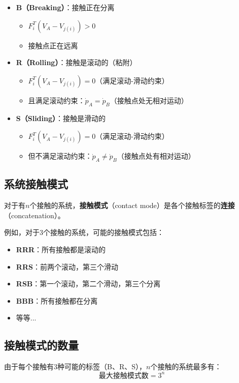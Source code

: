 \documentclass[12pt,a4paper]{article}
\begin{document}
\begin{itemize}
\item \textbf{B（Breaking）}：接触正在分离
  \begin{itemize}
  \item $F_i^T (V_A - V_{j(i)}) > 0$
  \item 接触点正在远离
  \end{itemize}

\item \textbf{R（Rolling）}：接触是滚动的（粘附）
  \begin{itemize}
  \item $F_i^T (V_A - V_{j(i)}) = 0$（满足滚动-滑动约束）
  \item 且满足滚动约束：$\dot{p}_A = \dot{p}_B$（接触点处无相对运动）
  \end{itemize}

\item \textbf{S（Sliding）}：接触是滑动的
  \begin{itemize}
  \item $F_i^T (V_A - V_{j(i)}) = 0$（满足滚动-滑动约束）
  \item 但不满足滚动约束：$\dot{p}_A \neq \dot{p}_B$（接触点处有相对运动）
  \end{itemize}
\end{itemize}

\subsection{系统接触模式}

对于有$n$个接触的系统，\textbf{接触模式}（contact mode）是各个接触标签的\textbf{连接}（concatenation）。

例如，对于3个接触的系统，可能的接触模式包括：
\begin{itemize}
\item \textbf{RRR}：所有接触都是滚动的
\item \textbf{RRS}：前两个滚动，第三个滑动
\item \textbf{RSB}：第一个滚动，第二个滑动，第三个分离
\item \textbf{BBB}：所有接触都在分离
\item 等等...
\end{itemize}

\subsection{接触模式的数量}

由于每个接触有3种可能的标签（B、R、S），$n$个接触的系统最多有：
\begin{equation}
\text{最大接触模式数} = 3^n
\label{eq:max_contact_modes}
\end{equation}
\end{document}
